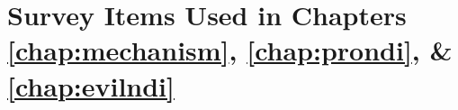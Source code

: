 \chapter{Survey Items Used in Chapters \ref{chap:mechanism}, \ref{chap:prondi},
    \& \ref{chap:evilndi}}
